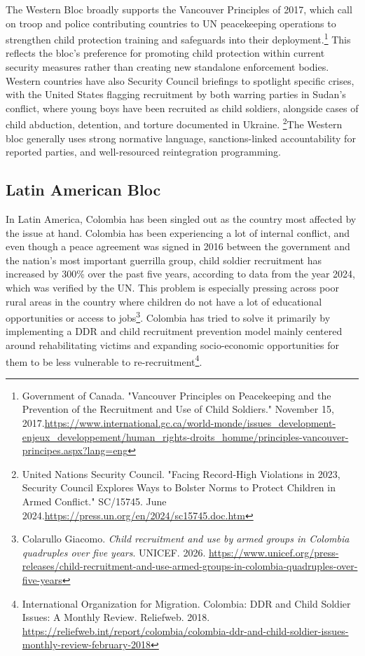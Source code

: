 The Western Bloc broadly supports the Vancouver Principles of 2017, which call on troop and police contributing countries to UN peacekeeping operations to strengthen child protection training and safeguards into their deployment.\footnote{Government of Canada. "Vancouver Principles on Peacekeeping and the Prevention of the Recruitment and Use of Child Soldiers." November 15, 2017.\url{https://www.international.gc.ca/world-monde/issues_development-enjeux_developpement/human_rights-droits_homme/principles-vancouver-principes.aspx?lang=eng}} This reflects the bloc’s preference for promoting child protection within current security measures rather than creating new standalone enforcement bodies. Western countries have also Security Council briefings to spotlight specific crises, with the United States flagging recruitment by both warring parties in Sudan’s conflict, where young boys have been recruited as child soldiers, alongside cases of child abduction, detention, and torture documented in Ukraine. \footnote{United Nations Security Council. "Facing Record-High Violations in 2023, Security Council Explores Ways to Bolster Norms to Protect Children in Armed Conflict." SC/15745. June 2024.\url{https://press.un.org/en/2024/sc15745.doc.htm}}The Western bloc generally uses strong normative language, sanctions-linked accountability for reported parties, and well-resourced reintegration programming.

\subsection{Latin American Bloc}

In Latin America, Colombia has been singled out as the country most affected by the issue at hand. Colombia has been experiencing a lot of internal conflict, and even though a peace agreement was signed in 2016 between the government and the nation’s most important guerrilla group, child soldier recruitment has increased by 300\% over the past five years, according to data from the year 2024, which was verified by the UN. This problem is especially pressing across poor rural areas in the country where children do not have a lot of educational opportunities or access to jobs\footnote{Colarullo Giacomo. \emph{Child recruitment and use by armed groups in Colombia quadruples over five years}. UNICEF. 2026. \url{https://www.unicef.org/press-releases/child-recruitment-and-use-armed-groups-in-colombia-quadruples-over-five-years}}. Colombia has tried to solve it primarily by implementing a DDR and child recruitment prevention model mainly centered around rehabilitating victims and expanding socio-economic opportunities for them to be less vulnerable to re-recruitment\footnote{International Organization for Migration. Colombia: DDR and Child Soldier Issues: A Monthly Review. Reliefweb. 2018. \url{https://reliefweb.int/report/colombia/colombia-ddr-and-child-soldier-issues-monthly-review-february-2018}}.

